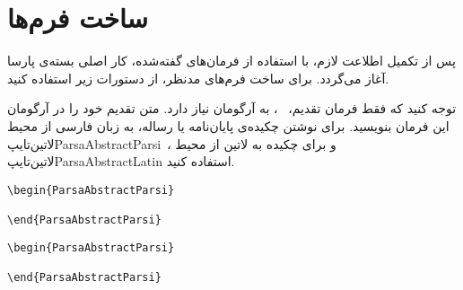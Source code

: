 \documentclass[12pt,a4paper,twoside,fleqn,notitlepage,openany]{extbook}
\begin{document}
\section{ساخت فرم‌ها}
پس از تکمیل اطلاعت لازم، با استفاده از فرمان‌های گفته‌شده، کار اصلی بسته‌ی پارسا آغاز می‌گردد\@. برای ساخت فرم‌های مدنظر، از دستورات زیر استفاده کنید.\\

\begin{table}[H] 
\end{table}

توجه کنید که فقط فرمان تقدیم، \textrm{}~، به آرگومان نیاز دارد\@. متن تقدیم خود را در آرگومان این فرمان بنویسید\@. 
برای نوشتن چکیده‌ی پایان‌نامه یا رساله، به زبان فارسی از محیط ‌لاتین{‌تایپ{ParsaAbstractParsi}}~، و برای چکیده به لاتین از محیط ‌لاتین{‌تایپ{ParsaAbstractLatin}} استفاده کنید\@. \\
\begin{latin}
\begin{minipage}{0.48\textwidth}
\begin{verbatim}
\begin{ParsaAbstractParsi}

\end{ParsaAbstractParsi}
\end{verbatim}
\end{minipage}
\begin{minipage}{0.48\textwidth}
\begin{verbatim}
\begin{ParsaAbstractParsi}

\end{ParsaAbstractParsi}
\end{verbatim}
\end{minipage}
\end{latin}
\end{document}
